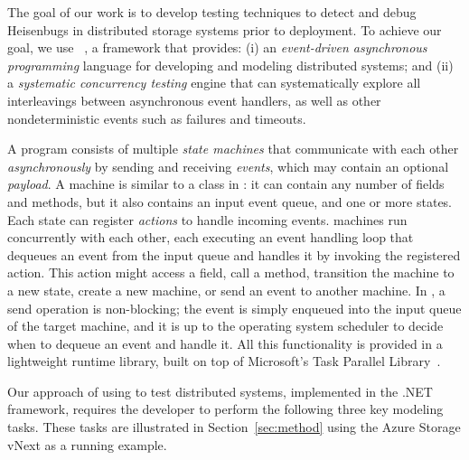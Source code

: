 The goal of our work is to develop testing techniques to detect and debug Heisenbugs in distributed storage systems prior to deployment.
To achieve our goal, we use \psharp~\cite{deligiannis2015psharp}, a framework that provides: (i) an \emph{event-driven asynchronous programming} language for developing and modeling distributed systems; and (ii) a \emph{systematic concurrency testing} engine that can systematically explore all interleavings between asynchronous event handlers, as well as other nondeterministic events such as failures and timeouts.

A \psharp program consists of multiple \emph{state machines} that communicate with each other \emph{asynchronously} by sending and receiving \emph{events}, which may contain an optional \emph{payload}. A \psharp machine is similar to a class in \csharp: it can contain any number of fields and methods, but it also contains an input event queue, and one or more states. Each state can register \emph{actions} to handle incoming events. \psharp machines run concurrently with each other, each executing an event handling loop that dequeues an event from the input queue and handles it by invoking the registered action. This action might access a field, call a method, transition the machine to a new state, create a new machine, or send an event to another machine. In \psharp, a send operation is non-blocking; the event is simply enqueued into the input queue of the target machine, and it is up to the operating system scheduler to decide when to dequeue an event and handle it. All this functionality is provided in a lightweight runtime library, built on top of Microsoft's Task Parallel Library~\cite{leijen2009tpl}.

Our approach of using \psharp to test distributed systems, implemented in the .NET framework, requires the developer to perform the following three key modeling tasks. These tasks are illustrated in Section~\ref{sec:method} using the Azure Storage vNext as a running example.

